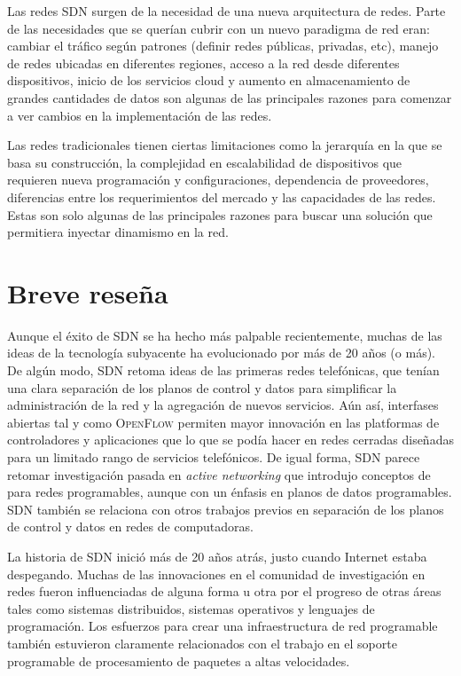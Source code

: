 \documentclass[10pt,journal,compsoc]{IEEEtran}
\begin{document}
Las redes SDN surgen de la necesidad de una nueva arquitectura de redes. Parte de las necesidades que se querían cubrir con un nuevo paradigma de red eran: cambiar el tráfico según patrones (definir redes públicas, privadas, etc), manejo de redes ubicadas en diferentes regiones, acceso a la red desde diferentes dispositivos, inicio de los servicios cloud y aumento en almacenamiento de grandes cantidades de datos son algunas de las principales razones para comenzar a ver cambios en la implementación de las redes. 

Las redes tradicionales tienen ciertas limitaciones como la jerarquía en la que se basa su construcción, la complejidad en escalabilidad de dispositivos que requieren nueva programación y configuraciones, dependencia de proveedores, diferencias entre los requerimientos del mercado y  las capacidades de las redes. Estas son solo algunas de las principales razones para buscar una solución que permitiera inyectar dinamismo en la red. 

\section{Breve reseña}
Aunque el éxito de SDN se ha hecho más palpable recientemente, muchas de las ideas de la tecnología subyacente ha evolucionado por más de 20 años (o más). De algún modo, SDN retoma ideas de las primeras redes telefónicas, que tenían una clara separación de los planos de control y datos para simplificar la administración de la red y la agregación de nuevos servicios. Aún así, interfases abiertas tal y como \textsc{OpenFlow} permiten mayor innovación en las platformas de controladores y aplicaciones que lo que se podía hacer en redes cerradas diseñadas para un limitado rango de servicios telefónicos. De igual forma, SDN parece retomar investigación pasada en \emph{active networking} que introdujo conceptos de para redes programables, aunque con un énfasis en planos de datos programables. SDN también se relaciona con otros trabajos previos en separación de los planos de control y datos en redes de computadoras.

La historia de SDN inició más de 20 años atrás, justo cuando Internet estaba despegando. Muchas de las innovaciones en el comunidad de investigación en redes fueron influenciadas de alguna forma u otra por el progreso de otras áreas tales como sistemas distribuidos, sistemas operativos y lenguajes de programación. Los esfuerzos para crear una infraestructura de red programable también estuvieron claramente relacionados con el trabajo en el soporte programable de procesamiento de paquetes a altas velocidades.
\end{document}
